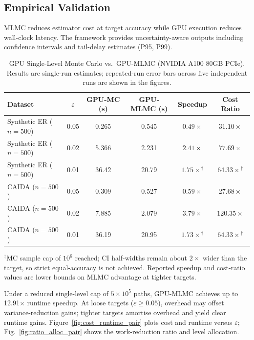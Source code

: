 \documentclass[journal]{IEEEtran}
\begin{document}
\subsection{Empirical Validation}

MLMC reduces estimator cost at target accuracy while GPU execution reduces wall-clock latency.
The framework provides uncertainty-aware outputs including confidence intervals and tail-delay
estimates (P95, P99).

\begin{table}[!t]
\caption{GPU Single-Level Monte Carlo vs.\ GPU-MLMC (NVIDIA A100 80GB PCIe). Results are
single-run estimates; repeated-run error bars across five independent runs are shown in the
figures.}
\label{tab:gpu_gpu_a100}
\centering\small
\begin{tabular*}{\textwidth}{@{\extracolsep\fill}l c c c c c@{}}
\toprule
Dataset & $\varepsilon$ & GPU-MC (s) & GPU-MLMC (s) & Speedup & Cost Ratio \\
\midrule
Synthetic ER ($n=500$) & 0.05 & 0.265 & 0.545 & $0.49\times$ & $31.10\times$ \\
Synthetic ER ($n=500$) & 0.02 & 5.366 & 2.231 & $2.41\times$ & $77.69\times$ \\
Synthetic ER ($n=500$) & 0.01 & 36.42 & 20.79 & $1.75\times$$^\dagger$ & $64.33\times$$^\dagger$ \\
CAIDA ($n=500$) & 0.05 & 0.309 & 0.527 & $0.59\times$ & $27.68\times$ \\
CAIDA ($n=500$) & 0.02 & 7.885 & 2.079 & $3.79\times$ & $120.35\times$ \\
CAIDA ($n=500$) & 0.01 & 36.19 & 20.95 & $1.73\times$$^\dagger$ & $64.33\times$$^\dagger$ \\
\bottomrule
\end{tabular*}
\vspace{2pt}
\footnotesize$^\dagger$MC sample cap of $10^6$ reached; CI half-widths remain about $2\times$
wider than the target, so strict equal-accuracy is not achieved. Reported speedup and cost-ratio
values are lower bounds on MLMC advantage at tighter targets.
\end{table}

Under a reduced single-level cap of $5\times10^5$ paths, GPU-MLMC achieves up to
12.91$\times$ runtime speedup. At loose targets ($\varepsilon\geq0.05$), overhead may offset
variance-reduction gains; tighter targets amortise overhead and yield clear runtime gains.
Figure~\ref{fig:cost_runtime_pair} plots cost and runtime versus $\varepsilon$;
Fig.~\ref{fig:ratio_alloc_pair} shows the work-reduction ratio and level allocation.
\end{document}
